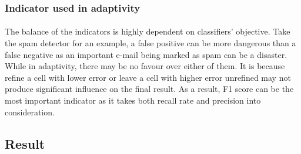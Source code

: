 
\subsubsection{Indicator used in adaptivity}
\paragraph{}
The balance of the indicators is highly dependent on classifiers' objective.
Take the spam detector for an example, a false positive can be more dangerous than a false negative as an important e-mail being marked as spam can be a disaster.
While in adaptivity, there may be no favour over either of them.
It is because refine a cell with lower error or leave a cell with higher error unrefined may not produce significant influence on the final result.
As a result, F1 score can be the most important indicator as it takes both recall rate and precision into consideration.


\subsection{Result}
